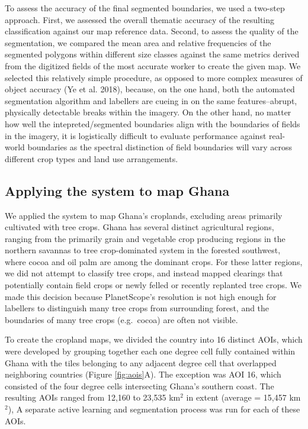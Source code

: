 \documentclass[11pt,a4paper]{article}
\begin{document}
To assess the accuracy of the final segmented boundaries, we used a
two-step approach. First, we assessed the overall thematic accuracy of
the resulting classification against our map reference data. Second, to
assess the quality of the segmentation, we compared the mean area and
relative frequencies of the segmented polygons within different size
classes against the same metrics derived from the digitized fields of
the most accurate worker to create the given map. We selected this
relatively simple procedure, as opposed to more complex measures of
object accuracy (Ye et al. 2018), because, on the one hand, both the
automated segmentation algorithm and labellers are cueing in on the same
features--abrupt, physically detectable breaks within the imagery. On
the other hand, no matter how well the intepreted/segmented boundaries
align with the boundaries of fields in the imagery, it is logistically
difficult to evaluate performance against real-world boundaries as the
spectral distinction of field boundaries will vary across different crop
types and land use arrangements.

\hypertarget{applying-the-system-to-map-ghana}{%
\subsection{Applying the system to map
Ghana}\label{applying-the-system-to-map-ghana}}

We applied the system to map Ghana's croplands, excluding areas
primarily cultivated with tree crops. Ghana has several distinct
agricultural regions, ranging from the primarily grain and vegetable
crop producing regions in the northern savannas to tree crop-dominated
system in the forested southwest, where cocoa and oil palm are among the
dominant crops. For these latter regions, we did not attempt to classify
tree crops, and instead mapped clearings that potentially contain field
crops or newly felled or recently replanted tree crops. We made this
decision because PlanetScope's resolution is not high enough for
labellers to distinguish many tree crops from surrounding forest, and
the boundaries of many tree crops (e.g.~cocoa) are often not visible.

To create the cropland maps, we divided the country into 16 distinct
AOIs, which were developed by grouping together each one degree cell
fully contained within Ghana with the tiles belonging to any adjacent
degree cell that overlapped neighboring countries (Figure
\ref{fig:aois}A). The exception was AOI 16, which consisted of the four
degree cells intersecting Ghana's southern coast. The resulting AOIs
ranged from 12,160 to 23,535 km\(^2\) in extent (average = 15,457
km\(^2\)), A separate active learning and segmentation process was run
for each of these AOIs.
\end{document}
